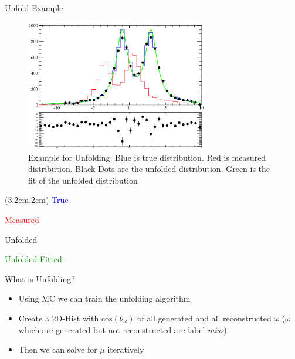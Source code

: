 \documentclass[
		10pt
		]{beamer}
\begin{document}
\begin{frame}{Unfold Example}




	\begin{figure}
		\vspace{0cm} 
		
		\includegraphics[width=8.0cm]{Plots/Tim}
		\captionsetup{labelformat=empty}
		\caption{Example for Unfolding. Blue is true distribution. Red is measured distribution. Black Dots are the unfolded distribution. Green is the fit of the unfolded distribution}
	\end{figure}
	
	
\begin{textblock*}{4.5cm}(3.2cm,2cm)
	\small \textcolor{blue}{True}	
	
	\small \textcolor{red}{Measured}
	
	\small \textcolor{black}{Unfolded}
	
	\small \textcolor{green}{Unfolded Fitted}
\end{textblock*}


	
	
\end{frame}





\iffalse


\begin{frame}{What is Unfolding?} 
\begin{itemize} 
		\item  Using MC we can train the unfolding algorithm
		\item Create a 2D-Hist with $ \textrm{cos}(\theta_{\omega}) $ of all generated and all reconstructed $\omega$ ($\omega$ which are generated but not reconstructed are label \textit{miss})
		\item Then we can solve for $\mu$ iteratively	
	\end{itemize}

\end{frame}
\end{document}
